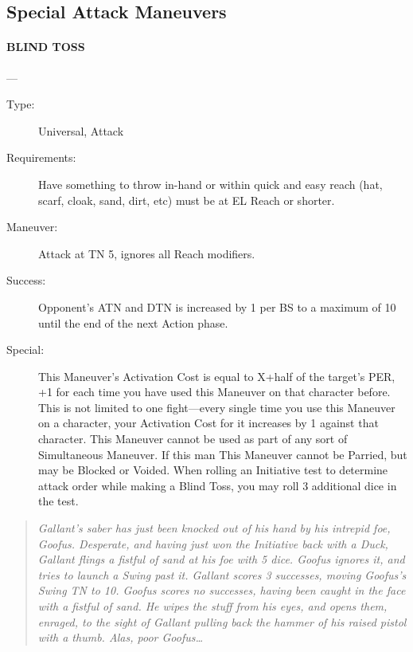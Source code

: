 \documentclass[oneside,11pt,english]{book}
\begin{document}
\subsection{Special Attack Maneuvers}
\paragraph{\large\label{man:BLIND TOSS} BLIND TOSS}---\quad{\large[X+Variable]}
\vspace{-10pt}\begin{description} 
\item [Type:] Universal, Attack 
\item [Requirements:] Have something to throw in-hand or within quick and easy reach (hat, scarf, cloak, sand, 
dirt, etc) must be at EL Reach or shorter. 
\item [Maneuver:] Attack at TN 5, ignores all Reach modifiers. 
\item [Success:] Opponent's ATN and DTN is increased by 1 per BS to a maximum of 10 until the end of the 
next Action phase. 
\item [Special:] This Maneuver’s Activation Cost is equal to X+half of the target's PER, +1 for each time you 
have used this Maneuver on that character before. This is not limited to one fight—every single time you 
use this Maneuver on a character, your Activation Cost for it increases by 1 against that character. 
This Maneuver cannot be used as part of any sort of Simultaneous Maneuver. 
If this man %
This Maneuver cannot be Parried, but may be Blocked or Voided. 
When rolling an Initiative test to determine attack order while making a Blind Toss, you may roll 3 
additional dice in the test.
\end{description}
\begin{quotation}
\emph{Gallant’s saber has just been knocked out of his hand by his intrepid foe, Goofus. Desperate, and having just won the Initiative 
back with a Duck, Gallant flings a fistful of sand at his foe with 5 dice. Goofus ignores it, and tries to launch a Swing past it. 
Gallant scores 3 successes, moving Goofus’s Swing TN to 10. Goofus scores no successes, having been caught in the face with a 
fistful of sand. He wipes the stuff from his eyes, and opens them, enraged, to the sight of Gallant pulling back the hammer of his 
raised pistol with a thumb. Alas, poor Goofus\ldots}
\end{quotation}
\end{document}
